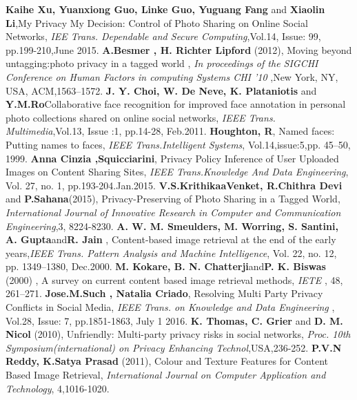 
\begin{thebibliography}{50}  %
%
\textbf{Kaihe Xu, Yuanxiong Guo, Linke Guo, Yuguang Fang } and \textbf{Xiaolin Li},My Privacy My Decision: Control of Photo Sharing on Online Social Networks, \textit{IEE Trans. Dependable and Secure Computing},Vol.14,  Issue: 99, pp.199-210,June 2015.
\textbf{A.Besmer , H. Richter Lipford }(2012), Moving beyond  untagging:photo privacy in a tagged world , \textit{In proceedings of the SIGCHI Conference on Human Factors in        computing  Systems CHI ’10} ,New York, NY, USA, ACM,1563–1572.
\textbf{ J. Y. Choi, W. De    Neve, K. Plataniotis } and \textbf{Y.M.Ro}Collaborative face recognition for improved face  annotation in personal photo collections shared on online social       networks, \textit{IEEE Trans. Multimedia},Vol.13, Issue :1, pp.14-28, Feb.2011.
\textbf{Houghton, R}, Named faces: Putting names to faces, \textit{IEEE Trans.Intelligent Systems}, Vol.14,issue:5,pp. 45–50, 1999.
\textbf{Anna Cinzia ,Squicciarini}, Privacy Policy Inference of User Uploaded Images on Content Sharing Sites,\textit{ IEEE Trans.Knowledge And Data Engineering}, Vol. 27, no. 1, pp.193-204.Jan.2015.
\textbf{V.S.KrithikaaVenket, R.Chithra Devi} and  \textbf{P.Sahana}(2015),  Privacy-Preserving of Photo Sharing in a Tagged World, \textit{International Journal of Innovative Research in Computer and Communication Engineering},3, 8224-8230.
\textbf{ A. W. M. Smeulders, M. Worring, S. Santini, A. Gupta}and\textbf{R. Jain} , Content-based image retrieval at the end of the early years,\textit{IEEE Trans. Pattern Analysis and Machine Intelligence}, Vol. 22, no. 12, pp. 1349–1380, Dec.2000.
\textbf{M. Kokare, B. N. Chatterji}and\textbf{P. K. Biswas} (2000) ,  A survey on current content based image retrieval methods, \textit{IETE} , 48, 261–271.
 \textbf{Jose.M.Such , Natalia Criado}, Resolving Multi Party Privacy Conflicts in Social Media, \textit{ IEEE Trans. on Knowledge and  Data  Engineering }, Vol.28, Issue: 7, pp.1851-1863, July 1 2016. 
\textbf{ K. Thomas, C. Grier }and\textbf{ D. M. Nicol} (2010),  Unfriendly: Multi-party privacy risks in social networks,\textit{ Proc. 10th Symposium(international) on Privacy Enhancing Technol},USA,236-252.
\textbf{P.V.N Reddy, K.Satya Prasad }(2011),   Colour and Texture Features for Content Based Image Retrieval,\textit{ International Journal on Computer Application and Technology}, 4,1016-1020.


\end{thebibliography}
